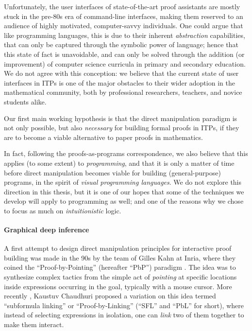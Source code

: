 Unfortunately, the user interfaces of state-of-the-art proof assistants are
mostly stuck in the pre-80s era of command-line interfaces, making them reserved
to an audience of highly motivated, computer-savvy individuals. One could argue
that like programming languages, this is due to their inherent
\emph{abstraction} capabilities, that can only be captured through the symbolic
power of language; hence that this state of fact is unavoidable, and can only be
solved through the addition (or improvement) of computer science curricula in
primary and secondary education. We do not agree with this conception: we
believe that the current state of user interfaces in ITPs is one of the major
obstacles to their wider adoption in the mathematical community, both by
professional researchers, teachers, and novice students alike.

\begin{emphpar}
  Our first main working hypothesis is that the direct manipulation paradigm is
  not only possible, but also \emph{necessary} for building formal proofs in
  ITPs, if they are to become a viable alternative to paper proofs in
  mathematics.
\end{emphpar}

In fact, following the proofs-as-programs correspondence, we also believe that
this applies (to some extent) to \emph{programming}, and that it is only a
matter of time before direct manipulation becomes viable for building
(general-purpose) programs, in the spirit of \emph{visual programming
languages}. We do not explore this direction in this thesis, but it is one of
our hopes that some of the techniques we develop will apply to programming as
well; and one of the reasons why we chose to focus as much on
\emph{intuitionistic} logic.

\paragraph{Graphical deep inference}

A first attempt to design direct manipulation principles for interactive proof
building was made in the 90s by the team of Gilles Kahn at Inria, where they
coined the ``Proof-by-Pointing'' (hereafter ``PbP'') paradigm .
The idea was to synthesize complex tactics from the simple act of
\emph{pointing} at specific locations inside expressions occurring in the goal,
typically with a mouse cursor. More recently , Kaustuv
Chaudhuri proposed a variation on this idea termed ``subformula linking'' or
``Proof-by-Linking'' (``SFL'' and ``PbL'' for short), where instead of selecting
expressions in isolation, one can \emph{link} two of them together to make them
interact.

